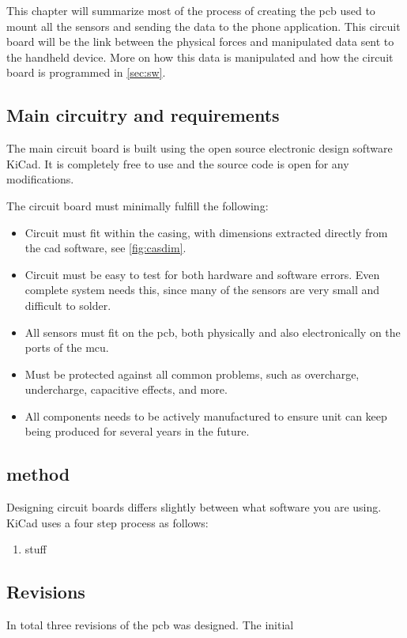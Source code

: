 This chapter will summarize most of the process of creating the \gls{pcb} used to mount all the sensors and sending the data to the phone application. This circuit board will be the link between the physical forces and manipulated data sent to the handheld device. More on how this data is manipulated and how the circuit board is programmed in \autoref{sec:sw}. 

\subsection{Main circuitry and requirements}\label{sec:hw:req}
The main circuit board is built using the open source electronic design software KiCad\cite{kicad}. It is completely free to use and the source code is open for any modifications.

The circuit board must minimally fulfill the following:
\begin{itemize}
\item Circuit must fit within the casing, with dimensions extracted directly from the cad software\cite{cad}, see \autoref{fig:casdim}.
\item Circuit must be easy to test for both hardware and software errors. Even complete system needs this, since many of the sensors are very small and difficult to solder.
\item All sensors must fit on the \gls{pcb}, both physically and also electronically on the ports of the \gls{mcu}.
\item Must be protected against all common problems, such as overcharge, undercharge, capacitive effects, and more.
\item All components needs to be actively manufactured to ensure unit can keep being produced for several years in the future.
\end{itemize}

\subsection{method}
Designing circuit boards differs slightly between what software you are using. KiCad\cite{kicad} uses a four step process as follows:
\begin{enumerate}
\item stuff
\end{enumerate}

\subsection{Revisions}\label{sec:hw:rev}
In total three revisions of the \gls{pcb} was designed. The initial 

